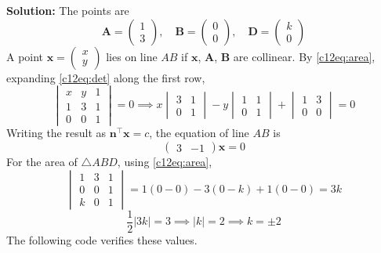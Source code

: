 \textbf{Solution:} The points are
\begin{equation}
\mathbf{A} = \begin{pmatrix} 1 \\ 3 \end{pmatrix}, \quad
\mathbf{B} = \begin{pmatrix} 0 \\ 0 \end{pmatrix}, \quad
\mathbf{D} = \begin{pmatrix} k \\ 0 \end{pmatrix}
\end{equation}
A point $\mathbf{x} = \begin{pmatrix} x \\ y \end{pmatrix}$ lies on line $AB$ if $\mathbf{x}$, $\mathbf{A}$, $\mathbf{B}$ are collinear. By \eqref{c12eq:area}, expanding \eqref{c12eq:det} along the first row,
\begin{equation}
\begin{vmatrix} x & y & 1 \\ 1 & 3 & 1 \\ 0 & 0 & 1 \end{vmatrix} = 0
\implies x\begin{vmatrix} 3 & 1 \\ 0 & 1 \end{vmatrix} - y\begin{vmatrix} 1 & 1 \\ 0 & 1 \end{vmatrix} + \begin{vmatrix} 1 & 3 \\ 0 & 0 \end{vmatrix} = 0
\end{equation}
Writing the result as $\mathbf{n}^{\top}\mathbf{x} = c$, the equation of line $AB$ is
\begin{equation}
\begin{pmatrix} 3 & -1 \end{pmatrix}\mathbf{x} = 0
\end{equation}
For the area of $\triangle ABD$, using \eqref{c12eq:area},
\begin{equation}
\begin{vmatrix} 1 & 3 & 1 \\ 0 & 0 & 1 \\ k & 0 & 1 \end{vmatrix}
= 1(0 - 0) - 3(0 - k) + 1(0 - 0) = 3k
\end{equation}
\begin{equation}
\frac{1}{2}|3k| = 3 \implies |k| = 2 \implies k = \pm 2
\end{equation}
The following code verifies these values.

